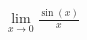\documentclass[preview]{standalone}
\begin{document}
\begin{align*}
\lim_{x \to 0} \frac{\sin(x)}{x}
\end{align*}
\end{document}
